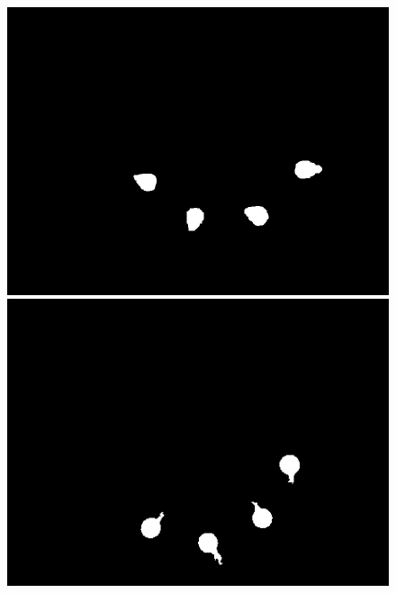 \documentclass[a4paper]{ctexart}
\begin{document}
\begin{enumerate}[label=\arabic*、]
\begin{enumerate}[label=\alph*)]
\begin{figure}[htbp]
\begin{minipage}[t]{0.25\textwidth}
			\end{minipage}\\
			\begin{minipage}[t]{0.25\textwidth}
				\centering
				\includegraphics[width=\textwidth]{figure/drop_1/img3.jpg}
			\end{minipage}
			\begin{minipage}[t]{0.25\textwidth}
				\centering
				\includegraphics[width=\textwidth]{figure/drop_1/img4.jpg}
			\end{minipage}
			\begin{minipage}[t]{0.25\textwidth}
				\centering

\end{minipage}
\end{figure}
\end{enumerate}
\end{enumerate}
\end{document}
